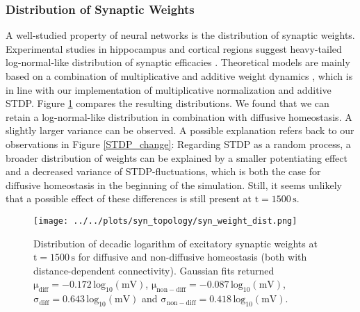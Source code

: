 \documentclass[10pt,a4paper]{article}
\begin{document}
\subsubsection{Distribution of Synaptic Weights} \label{Syn_Weight_Dist_Section}
A well-studied property of neural networks is the distribution of synaptic weights. Experimental studies in hippocampus and cortical regions suggest heavy-tailed log-normal-like distribution of synaptic efficacies \cite{Song_Connectivity_2005,Lisman_Synapses_1993,Yasumatsu_Synapses_2008,Loewenstein_Spine_Sizes}. Theoretical models are mainly based on a combination of multiplicative and additive weight dynamics \cite{Loewenstein_Spine_Sizes,Statman_Synapses_2014}, which is in line with our implementation of multiplicative normalization and additive STDP. Figure \ref{Weight_Dist} compares the resulting distributions. We found that we can retain a log-normal-like distribution in combination with diffusive homeostasis. A slightly larger variance can be observed. A possible explanation refers back to our observations in Figure \ref{STDP_change}: Regarding STDP as a random process, a broader distribution of weights can be explained by a smaller potentiating effect and a decreased variance of STDP-fluctuations, which is both the case for diffusive homeostasis in the beginning of the simulation. Still, it seems unlikely that a possible effect of these differences is still present at $\mathrm{t=1500\,s}$.
\begin{figure}
\texttt{[image: ../../plots/syn\_topology/syn\_weight\_dist.png]}
\caption{Distribution of decadic logarithm of excitatory synaptic weights at $\mathrm{t=1500\,s}$ for diffusive and non-diffusive homeostasis (both with distance-dependent connectivity). Gaussian fits returned $\mathrm{\mu_{diff}=-0.172\, log_{10}(mV)}$, $\mathrm{\mu_{non-diff}=-0.087\, log_{10}(mV)}$, $\mathrm{\sigma_{diff}=0.643\, log_{10}(mV)}$ and $\mathrm{\sigma_{non-diff}=0.418\, log_{10}(mV)}$.}
\label{Weight_Dist}
\end{figure}
\end{document}
